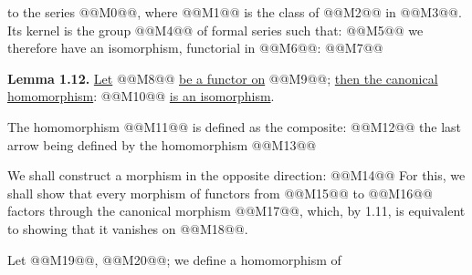 to the series @@M0@@, where @@M1@@ is the class of @@M2@@ in @@M3@@. Its kernel is the group @@M4@@ of formal series such that:
@@M5@@
we therefore have an isomorphism, functorial in @@M6@@:
@@M7@@

\textbf{Lemma 1.12.} \uline{Let} @@M8@@ \uline{be a functor on} @@M9@@; \uline{then the canonical homomorphism}:
@@M10@@
\uline{is an isomorphism}.

The homomorphism @@M11@@ is defined as the composite:
@@M12@@
the last arrow being defined by the homomorphism @@M13@@

We shall construct a morphism in the opposite direction:
@@M14@@
For this, we shall show that every morphism of functors from @@M15@@ to @@M16@@ factors through the canonical morphism @@M17@@, which, by 1.11, is equivalent to showing that it vanishes on @@M18@@.

Let @@M19@@, @@M20@@; we define a homomorphism of
